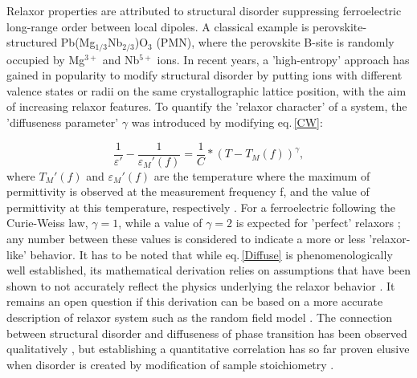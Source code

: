 \documentclass[%
 preprint, %
 amsmath,amssymb,
 aps, physrev,
]{revtex4-2}
\begin{document}
Relaxor properties are attributed to structural disorder suppressing ferroelectric long-range order between local dipoles. A classical example is perovskite-structured Pb(Mg$_{1/3}$Nb$_{2/3}$)O$_3$ (PMN), where the perovskite B-site is randomly occupied by Mg$^{3+}$ and Nb$^{5+}$ ions. In recent years, a 'high-entropy' approach has gained in popularity \cite{Zhou22} to modify structural disorder by putting ions with different valence states or radii on the same crystallographic lattice position, with the aim of increasing relaxor features. To quantify the 'relaxor character' of a system, the 'diffuseness parameter' $\gamma$ was introduced by modifying eq.\,\ref{CW}: 

\begin{equation}\label{Diffuse}
    \frac{1}{\varepsilon'}-\frac{1}{\varepsilon_M'(f)}=\frac{1}{C}*(T-T_M(f))^\gamma,
\end{equation}
where $T_M'(f)$ and $\varepsilon_M'(f)$ are the temperature where the maximum of permittivity is observed at the measurement frequency f, and the value of permittivity at this temperature, respectively \cite{Uchino82}. For a ferroelectric following the Curie-Weiss law, $\gamma = 1$, while a value of $\gamma=2$ is expected for 'perfect' relaxors  \cite{Kirillov73}; any number between these values is considered to indicate a more or less 'relaxor-like' behavior. It has to be noted that while eq.\,\ref{Diffuse} is phenomenologically well established, its mathematical derivation relies on assumptions that have been shown to not accurately reflect the physics underlying the relaxor behavior \cite{Ahn16}. It remains an open question if this derivation can be based on a more accurate description of relaxor system such as the random field model \cite{Westphal92}. The connection between structural disorder and diffuseness of phase transition has been observed qualitatively \cite{Baskaran01}, but establishing a quantitative correlation has so far proven elusive when disorder is created by modification of sample stoichiometry \cite{Lei06}.
\end{document}
